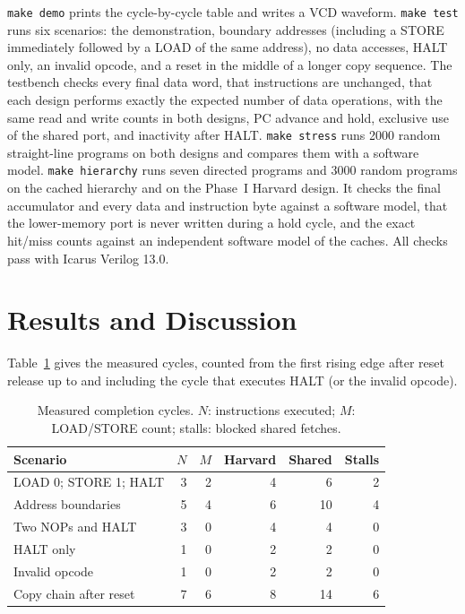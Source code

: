 \documentclass[conference,a4paper]{IEEEtran}
\begin{document}
\texttt{make demo} prints the cycle-by-cycle table and writes a VCD
waveform. \texttt{make test} runs six scenarios: the demonstration,
boundary addresses (including a STORE immediately followed by a LOAD of
the same address), no data accesses, HALT only, an invalid opcode, and a
reset in the middle of a longer copy sequence. The testbench checks every
final data word, that instructions are unchanged, that each design
performs exactly the expected number of data operations, with the same
read and write counts in both designs, PC advance and hold, exclusive use of the shared port,
and inactivity after HALT. \texttt{make stress} runs 2000 random
straight-line programs on both designs and compares them with a software
model. \texttt{make hierarchy} runs seven directed programs and 3000 random
programs on the cached hierarchy and on the Phase~I Harvard design. It checks
the final accumulator and every data and instruction byte against a software
model, that the lower-memory port is never written during a hold cycle, and the
exact hit/miss counts against an independent software model of the caches.
All checks pass with Icarus Verilog 13.0.

\section{Results and Discussion}
Table~\ref{tab:results} gives the measured cycles, counted from the
first rising edge after reset release up to and including the cycle that
executes HALT (or the invalid opcode).

\begin{table}[t]
\caption{Measured completion cycles. $N$: instructions executed;
$M$: LOAD/STORE count; stalls: blocked shared fetches.}
\label{tab:results}
\centering
\begin{tabular}{lrrrrr}
\hline
Scenario & $N$ & $M$ & Harvard & Shared & Stalls \\ \hline
LOAD 0; STORE 1; HALT & 3 & 2 & 4 & 6 & 2 \\
Address boundaries & 5 & 4 & 6 & 10 & 4 \\
Two NOPs and HALT & 3 & 0 & 4 & 4 & 0 \\
HALT only & 1 & 0 & 2 & 2 & 0 \\
Invalid opcode & 1 & 0 & 2 & 2 & 0 \\
Copy chain after reset & 7 & 6 & 8 & 14 & 6 \\ \hline
\end{tabular}
\end{table}
\end{document}
